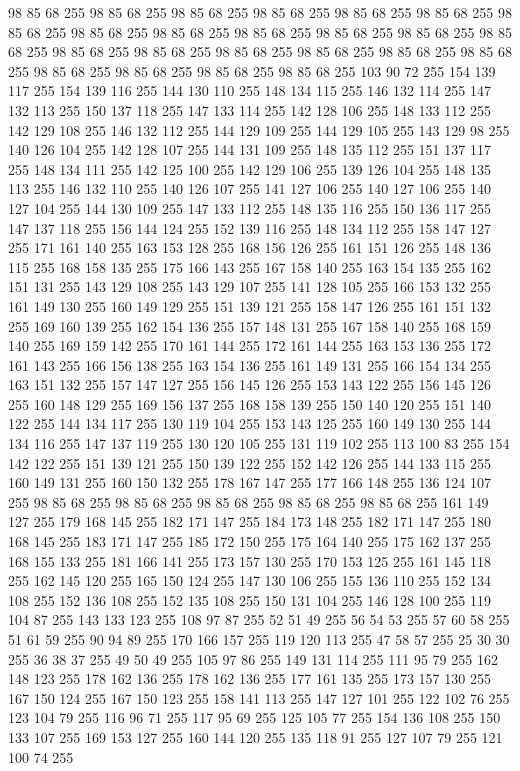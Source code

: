 98 85 68 255 98 85 68 255 98 85 68 255 98 85 68 255 98 85 68 255 98 85 68 255 98 85 68 255 98 85 68 255 98 85 68 255 98 85 68 255 98 85 68 255 98 85 68 255 98 85 68 255 98 85 68 255 98 85 68 255 98 85 68 255 98 85 68 255 98 85 68 255 98 85 68 255 98 85 68 255 98 85 68 255 98 85 68 255 98 85 68 255 103 90 72 255 154 139 117 255 154 139 116 255 144 130 110 255 148 134 115 255 146 132 114 255 147 132 113 255 150 137 118 255 147 133 114 255 142 128 106 255 148 133 112 255 142 129 108 255 146 132 112 255 144 129 109 255 144 129 105 255 143 129 98 255 140 126 104 255 142 128 107 255 144 131 109 255 148 135 112 255 151 137 117 255 148 134 111 255 142 125 100 255 142 129 106 255 139 126 104 255 148 135 113 255 146 132 110 255 140 126 107 255 141 127 106 255 140 127 106 255 140 127 104 255 144 130 109 255 147 133 112 255 148 135 116 255 150 136 117 255 147 137 118 255 156 144 124 255 152 139 116 255 148 134 112 255 158 147 127 255 171 161 140 255
163 153 128 255 168 156 126 255 161 151 126 255 148 136 115 255 168 158 135 255 175 166 143 255 167 158 140 255 163 154 135 255 162 151 131 255 143 129 108 255 143 129 107 255 141 128 105 255 166 153 132 255 161 149 130 255 160 149 129 255 151 139 121 255 158 147 126 255 161 151 132 255 169 160 139 255 162 154 136 255 157 148 131 255 167 158 140 255 168 159 140 255 169 159 142 255 170 161 144 255 172 161 144 255 163 153 136 255 172 161 143 255 166 156 138 255 163 154 136 255 161 149 131 255 166 154 134 255 163 151 132 255 157 147 127 255 156 145 126 255 153 143 122 255 156 145 126 255 160 148 129 255 169 156 137 255 168 158 139 255 150 140 120 255 151 140 122 255 144 134 117 255 130 119 104 255 153 143 125 255 160 149 130 255 144 134 116 255 147 137 119 255 130 120 105 255 131 119 102 255 113 100 83 255 154 142 122 255 151 139 121 255 150 139 122 255 152 142 126 255 144 133 115 255 160 149 131 255 160 150 132 255 178 167 147 255 177 166 148 255 136 124 107 255 98 85 68 255 98 85 68 255 98 85 68 255
98 85 68 255 98 85 68 255 161 149 127 255 179 168 145 255 182 171 147 255 184 173 148 255 182 171 147 255 180 168 145 255 183 171 147 255 185 172 150 255 175 164 140 255 175 162 137 255 168 155 133 255 181 166 141 255 173 157 130 255 170 153 125 255 161 145 118 255 162 145 120 255 165 150 124 255 147 130 106 255 155 136 110 255 152 134 108 255 152 136 108 255 152 135 108 255 150 131 104 255 146 128 100 255 119 104 87 255 143 133 123 255 108 97 87 255 52 51 49 255 56 54 53 255 57 60 58 255 51 61 59 255 90 94 89 255 170 166 157 255 119 120 113 255 47 58 57 255 25 30 30 255 36 38 37 255 49 50 49 255 105 97 86 255 149 131 114 255 111 95 79 255 162 148 123 255 178 162 136 255 178 162 136 255 177 161 135 255 173 157 130 255 167 150 124 255 167 150 123 255 158 141 113 255 147 127 101 255 122 102 76 255 123 104 79 255 116 96 71 255 117 95 69 255 125 105 77 255 154 136 108 255 150 133 107 255 169 153 127 255 160 144 120 255 135 118 91 255 127 107 79 255 121 100 74 255
